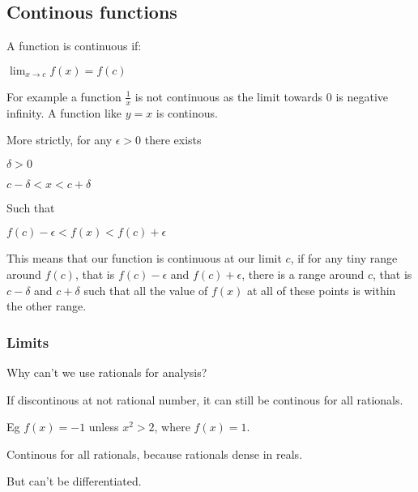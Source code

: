 
\subsection{Continous functions}

A function is continuous if:

\(\lim_{x\rightarrow c} f(x)=f(c)\)

For example a function \(\frac{1}{x}\) is not continuous as the limit towards \(0\) is negative infinity. A function like \(y=x\) is continous.

More strictly, for any \(\epsilon >0\) there exists

\(\delta >0 \)

\(c-\delta < x< c +\delta \)

Such that

\(f(c)-\epsilon < f(x) < f(c)+\epsilon \)

This means that our function is continuous at our limit \(c\), if for any tiny range around \(f(c)\), that is \(f(c)-\epsilon\) and \(f(c)+\epsilon\), there is a range around \(c\), that is \(c-\delta \) and \(c+ \delta \) such that all the value of \(f(x)\) at all of these points is within the other range.

\subsubsection{Limits}

Why can't we use rationals for analysis?

If discontinous at not rational number, it can still be continous for all rationals.

Eg \(f(x)=-1\) unless \(x^2>2\), where \(f(x)=1\).

Continous for all rationals, because rationals dense in reals.

But can't be differentiated.

